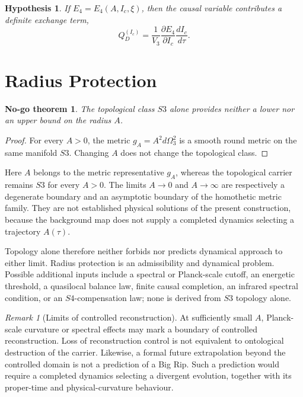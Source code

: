 \documentclass[11pt,a4paper]{article}
\def\Sthree{S3}%
\def\Sfour{S4}%
\def\dd{d}%
\numberwithin{equation}{section}
\newtheorem{hypothesis}[criterion]{Hypothesis}
\newtheorem{nogotheorem}[criterion]{No-go theorem}
\theoremstyle{remark}
\newtheorem{remark}[criterion]{Remark}
\newcommand{\Sthree}{S^3}
\newcommand{\Sfour}{S^4}
\newcommand{\Efour}{E_4}
\newcommand{\dd}{\mathrm{d}}
\begin{document}
\begin{hypothesis}
If \(\Efour=\Efour(A,I_c,\xi)\), then the causal variable contributes a definite exchange term,
\begin{equation}
Q_D^{(I_c)}=\frac{1}{V_3}\frac{\partial\Efour}{\partial I_c}\frac{\dd I_c}{\dd\tau}.
\end{equation}
\end{hypothesis}

\section{Radius Protection}
\begin{nogotheorem}
The topological class \(\Sthree\) alone provides neither a lower nor an upper bound on the radius \(A\).
\end{nogotheorem}
\begin{proof}
For every \(A>0\), the metric \(g_A=A^2\dd\Omega_3^2\) is a smooth round metric on the same manifold \(\Sthree\). Changing \(A\) does not change the topological class.
\end{proof}

Here \(A\) belongs to the metric representative \(g_A\), whereas the topological carrier remains \(\Sthree\) for every \(A>0\). The limits \(A\to0\) and \(A\to\infty\) are respectively a degenerate boundary and an asymptotic boundary of the homothetic metric family. They are not established physical solutions of the present construction, because the background map does not supply a completed dynamics selecting a trajectory \(A(\tau)\).

Topology alone therefore neither forbids nor predicts dynamical approach to either limit. Radius protection is an admissibility and dynamical problem. Possible additional inputs include a spectral or Planck-scale cutoff, an energetic threshold, a quasilocal balance law, finite causal completion, an infrared spectral condition, or an \(\Sfour\)-compensation law; none is derived from \(\Sthree\) topology alone.

\begin{remark}[Limits of controlled reconstruction]
At sufficiently small \(A\), Planck-scale curvature or spectral effects may mark a boundary of controlled reconstruction. Loss of reconstruction control is not equivalent to ontological destruction of the carrier. Likewise, a formal future extrapolation beyond the controlled domain is not a prediction of a Big Rip. Such a prediction would require a completed dynamics selecting a divergent evolution, together with its proper-time and physical-curvature behaviour.
\end{remark}
\end{document}
